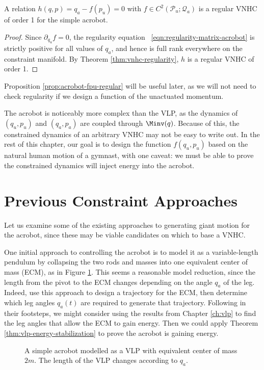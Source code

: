 \begin{prop}\label{prop:acrobot-fpu-regular}
    A relation \(h(q,p) = q_a - f(p_u) = 0\) 
    with \(f \in C^2\left(\mathcal{P}_u; \mathcal{Q}_a\right)\) is a regular
    VNHC of order 1 for the simple acrobot.
\end{prop}
\begin{proof}
    Since \(\partial_{q_u} f = 0\), the regularity equation
    ~\eqref{eqn:regularity-matrix-acrobot} is strictly positive for all values
    of \(q_a\), and hence is full rank everywhere on the constraint manifold.
    By Theorem \ref{thm:vnhc-regularity}, \(h\) is a regular VNHC of order 1.
\end{proof}
Proposition \ref{prop:acrobot-fpu-regular} will be useful later, as we will not
need to check regularity if we design a function of the unactuated momentum. 

The acrobot is noticeably more complex than the VLP, as
the dynamics of \((q_u,p_u)\) and \((q_a,p_a)\) are coupled through \(\Minv(q)\).
Because of this, the constrained dynamics of an arbitrary VNHC may not be easy
to write out.
In the rest of this chapter, our goal is to design the function \(f(q_u,p_u)\)
based on the natural human motion of a gymnast, with one caveat: 
we must be able to prove the constrained dynamics will inject energy into the
acrobot.

\section{Previous Constraint Approaches}
Let us examine some of the existing approaches to generating giant motion for
the acrobot, since these may be viable candidates on which to base a VNHC.

One initial approach to controlling the acrobot is to model it as a
variable-length pendulum by collapsing the two rods and masses into one
equivalent center of mass (ECM), as in Figure \ref{fig:acrobot-ecm}.
This seems a reasonable model reduction, since the length from the pivot to the
ECM changes depending on the angle \(q_a\) of the leg.
Indeed, \citet{swingup_giant_acrobot} use this approach to design a trajectory
for the ECM, then determine which leg angles \(q_a(t)\) are required to generate
that trajectory.
Following in their footsteps, we might consider using the results
from Chapter \ref{ch:vlp} to find the leg angles that allow the ECM to gain
energy. 
Then we could apply Theorem \ref{thm:vlp-energy-stabilization} to prove
the acrobot is gaining energy.
\begin{figure}
    \centering
    
    \caption{A simple acrobot modelled as a VLP with equivalent center of mass \(2m\). 
        The length of the VLP changes according to \(q_a\).}
    \label{fig:acrobot-ecm}
\end{figure}

